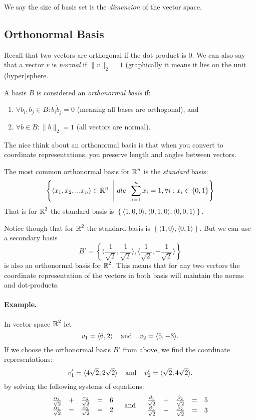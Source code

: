 We say the size of basis set is the \emph{dimension} of the vector space. 

\subsection{Orthonormal Basis}
Recall that two vectors are orthogonal if the dot product is 0. 
We can also say that a vector $v$ is \emph{normal} if $\|v\|_2=1$ (graphically it means it lies on the unit (hyper)sphere. 

A basis $B$ is considered an \emph{orthonormal basis} if:
\begin{enumerate}
\item $\forall b_i, b_j\in B: b_i \dot b_j = 0$ (meaning all bases are orthogonal), and 
\item $\forall b \in B : \|b\|_2=1$ (all vectors are normal). 
\end{enumerate}

The nice think about an orthonormal basis is that when you convert to coordinate representations, you preserve length and angles between vectors. 

The most common orthonormal basis for $\operatorname{\mathbb{R}}^n$ is the \emph{standard} basis: 
\[\left\{\left\langle x_1, x_2, ... x_n\right\rangle \in \operatorname{\mathbb{R}}^n \;\;\middle|\;dle|\; \sum_{i=1}^n x_i = 1, \forall i : x_i \in \left\{0,1\right\}\right\}\]
That is for $\operatorname{\mathbb{R}}^3$ the standard basis is $\left\{\langle1,0,0\rangle,\langle0,1,0\rangle,\langle0,0,1\rangle\right\}$.

Notice though that for $\operatorname{\mathbb{R}}^2$ the standard basis is $\left\{\langle1,0\rangle,\langle0,1\rangle\right\}$.
But we can use a secondary basis \[B'=\left\{\langle\frac{1}{\sqrt{2}},\frac{1}{\sqrt{2}}\rangle,\langle\frac{1}{\sqrt{2}},-\frac{1}{\sqrt{2}}\rangle\right\}\] is also an orthonormal basis for $\operatorname{\mathbb{R}}^2$. 
This means that for any two vectors the coordinate representation of the vectors in both basis will maintain the norms and dot-products. 

\paragraph{Example.}
In vector space $\operatorname{\mathbb{R}}^2$ let \[v_1 = \langle6,2\rangle\;\;\;\;\textnormal{and}\;\;\;\; v_2 = \langle5,-3\rangle.\]
If we choose the orthonormal basis  $B'$ from above, 
we find the coordinate representations:
\[
v'_1 = \langle4\sqrt{2},2\sqrt{2}\rangle \;\;\;\;\textnormal{and}\;\;\;\; v'_2 = \langle\sqrt{2},4\sqrt{2}\rangle.
\]
by solving the following systems of equations: 
\[
\begin{array}{rcrcr}
\frac{\alpha_1}{\sqrt{2}} &+& \frac{\alpha_2}{\sqrt{2}} &=& 6\\
\frac{\alpha_1}{\sqrt{2}} &-& \frac{\alpha_2}{\sqrt{2}} &=& 2\\ 
\end{array} \;\;\;\;\textnormal{and}\;\;\;\; \begin{array}{rcrcr}
\frac{\beta_1}{\sqrt{2}} &+& \frac{\beta_2}{\sqrt{2}} &=& 5\\
\frac{\beta_1}{\sqrt{2}} &-& \frac{\beta_2}{\sqrt{2}} &=& 3\\ 
\end{array}\]

